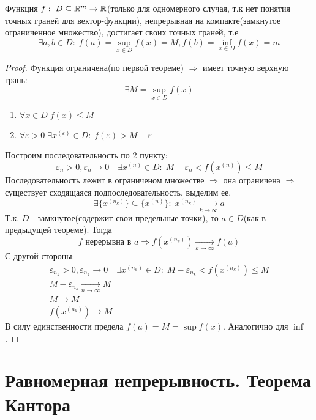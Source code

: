 \newpage
\begin{theorem}
    Функция $f:\; D \subseteq \mathbb{R}^m \rightarrow \mathbb{R}$(только для одномерного случая, т.к нет понятия точных граней для вектор-функции), 
    непрерывная на компакте(замкнутое ограниченное множество), достигает своих точных граней, т.е
    \[\exists a, b \in D:\; f(a)=\sup_{x\in D}{f(x)} =M , f(b)=\inf_{x\in D}{f(x)}=m \]
\end{theorem}

\begin{proof}
    Функция ограничена(по первой теореме) $\Rightarrow$ имеет точную верхную грань: 
    \[\exists M = \sup_{x\in D}{f(x)}\]
    \begin{enumerate}
        \item $\forall x \in D\; f(x) \leqslant M$
        \item $\forall \varepsilon > 0\; \exists x^{(\varepsilon)} \in D:\; f(\varepsilon) > M - \varepsilon$
    \end{enumerate}
    Построим последовательность по 2 пункту:
    \[
        \varepsilon_n > 0, \varepsilon_n \rightarrow 0 \quad \exists x^{(n)} \in D:\; M-\varepsilon_n < f(x^{(n)}) \leqslant M
    \]
    Последовательность лежит в ограниченом множестве $\Rightarrow$ она ограничена $\Rightarrow$ 
        существует сходящаяся подпоследовательность, выделим ее. 
    \[
        \exists \{x^{(n_k)}\} \subseteq \{x^{(n)}\}:\; x^{(n_k)} \xrightarrow[k \rightarrow \infty]{} a
    \]
    Т.к. $D$ - замкнутое(содержит свои предельные точки), то $a \in D$(как в предыдущей теореме). Тогда
    \[
        f \text{ нерерывна в } a \Rightarrow f(x^{(n_k)}) \xrightarrow[k \rightarrow \infty]{} f(a)
    \]
    С другой стороны:
    \begin{gather*}
        \varepsilon_{n_k} > 0, \varepsilon_{n_k} \rightarrow 0 \quad \exists x^{(n_k)} \in D:\; M-\varepsilon_{n_k} < f(x^{(n_k)}) \leqslant M\\
        M-\varepsilon_{n_k} \xrightarrow[n \rightarrow \infty]{} M\\
        M \rightarrow M\\
        f(x^{(n_k)}) \rightarrow M
    \end{gather*}
    В силу единственности предела $f(a) = M =\sup{f(x)}$. Аналогично для $\inf$.
\end{proof}

\newpage
\section{Равномерная непрерывность. Теорема Кантора}

